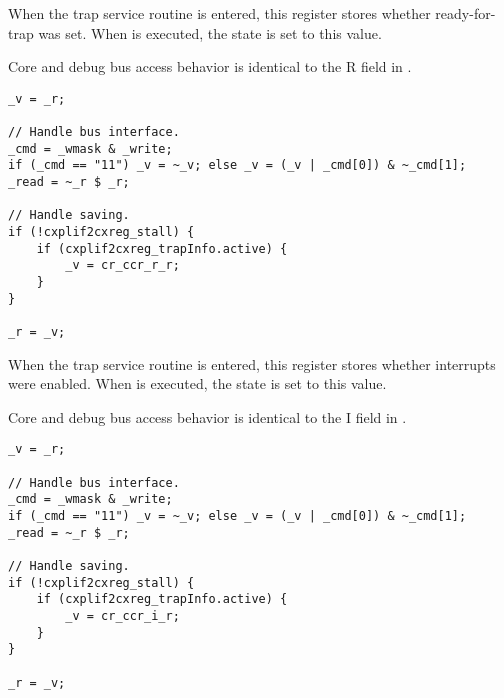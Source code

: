 When the trap service routine is entered, this register stores whether 
ready-for-trap was set. When  is executed, the state is set to this
value.

Core and debug bus access behavior is identical to the R field in .

\declaration{}
\implementation{}
\begin{lstlisting}
_v = _r;

// Handle bus interface.
_cmd = _wmask & _write;
if (_cmd == "11") _v = ~_v; else _v = (_v | _cmd[0]) & ~_cmd[1];
_read = ~_r $ _r;

// Handle saving.
if (!cxplif2cxreg_stall) {
    if (cxplif2cxreg_trapInfo.active) {
        _v = cr_ccr_r_r;
    }
}

_r = _v;
\end{lstlisting}

When the trap service routine is entered, this register stores whether 
interrupts were enabled. When  is executed, the state is set to this
value.

Core and debug bus access behavior is identical to the I field in .

\declaration{}
\implementation{}
\begin{lstlisting}
_v = _r;

// Handle bus interface.
_cmd = _wmask & _write;
if (_cmd == "11") _v = ~_v; else _v = (_v | _cmd[0]) & ~_cmd[1];
_read = ~_r $ _r;

// Handle saving.
if (!cxplif2cxreg_stall) {
    if (cxplif2cxreg_trapInfo.active) {
        _v = cr_ccr_i_r;
    }
}

_r = _v;
\end{lstlisting}


